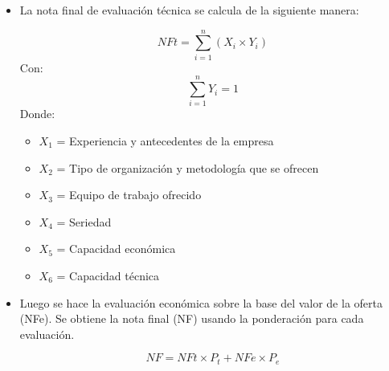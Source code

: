 \documentclass{article} %
\begin{document}
\begin{itemize}[label={},left=0pt,align=parleft]
\begin{itemize}[label={},left=1em,align=parleft]
\begin{itemize}[label={},left=2em,align=parleft]
            \item \begin{highlightbox}[levelthree] La nota final de evaluación técnica se calcula de la siguiente manera: \end{highlightbox}
            \begin{equation}
                NFt = \sum_{i=1}^{n} (X_i \times Y_i)
            \end{equation}
            Con:
            \begin{equation}
                \sum_{i=1}^{n} Y_i = 1 
            \end{equation}
            Donde:
            \begin{itemize}[label={},left=3em,align=parleft]
                \item \begin{highlightbox}[levelfour] $X_1$ = Experiencia y antecedentes de la empresa \end{highlightbox}
                \item \begin{highlightbox}[levelfour] $X_2$ = Tipo de organización y metodología que se ofrecen \end{highlightbox}
                \item \begin{highlightbox}[levelfour] $X_3$ = Equipo de trabajo ofrecido \end{highlightbox}
                \item \begin{highlightbox}[levelfour] $X_4$ = Seriedad \end{highlightbox}
                \item \begin{highlightbox}[levelfour] $X_5$ = Capacidad económica \end{highlightbox}
                \item \begin{highlightbox}[levelfour] $X_6$ = Capacidad técnica \end{highlightbox}
            \end{itemize}
            \item \begin{highlightbox}[levelthree] Luego se hace la evaluación económica sobre la base del valor de la oferta (NFe). Se obtiene la nota final (NF) usando la ponderación para cada evaluación. \end{highlightbox}
            \begin{equation}
                NF = NFt \times P_t + NFe \times P_e
            \end{equation}
        \end{itemize}
    \end{itemize}
\end{itemize}
\end{document}
